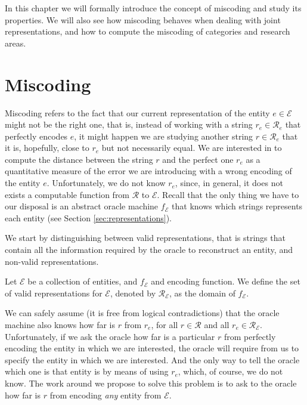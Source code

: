 In this chapter we will formally introduce the concept of miscoding and study its properties. We will also see how miscoding behaves when dealing with joint representations, and how to compute the miscoding of categories and research areas.

%
%
\section{Miscoding}
\label{sec:miscoding}

Miscoding refers to the fact that our current representation of the entity $e \in \mathcal{E}$ might not be the right one, that is, instead of working with a string $r_e \in \mathcal{R}_e$ that perfectly encodes $e$, it might happen we are studying another string $r \in \mathcal{R}_e$ that it is, hopefully, close to $r_e$ but not necessarily equal. We are interested in to compute the distance between the string $r$ and the perfect one $r_e$ as a quantitative measure of the error we are introducing with a wrong encoding of the entity $e$. Unfortunately, we do not know $r_e$, since, in general, it does not exists a computable function from $\mathcal{R}$ to $\mathcal{E}$. Recall that the only thing we have to our disposal is an abstract oracle machine $f_\mathcal{E}$ that knows which strings represents each entity (see Section \ref{sec:representations}).

We start by distinguishing between valid representations, that is strings that contain all the information required by the oracle to reconstruct an entity, and non-valid representations.

\begin{definition}
Let $\mathcal{E}$ be a collection of entities, and $f_\mathcal{E}$ and encoding function. We define the set of valid representations for $\mathcal{E}$, denoted by $\mathcal{R}_\mathcal{E}$, as the domain of $f_\mathcal{E}$.
\end{definition}

We can safely assume (it is free from logical contradictions) that the oracle machine also knows how far is $r$ from $r_e$, for all $r \in \mathcal{R}$ and all $r_e \in \mathcal{R}_\mathcal{E}$. Unfortunately, if we ask the oracle how far is a particular $r$ from perfectly encoding the entity in which we are interested, the oracle will require from us to specify the entity in which we are interested. And the only way to tell the oracle which one is that entity is by means of using $r_e$, which, of course, we do not know. The work around we propose to solve this problem is to ask to the oracle how far is $r$ from encoding \emph{any} entity from $\mathcal{E}$.

